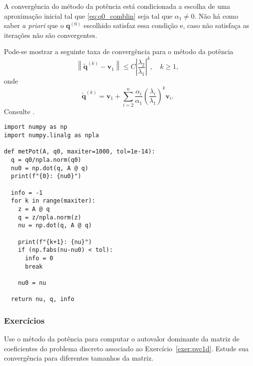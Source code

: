 \begin{observacao}
  A convergência do método da potência está condicionada a escolha de uma aproximação inicial tal que \eqref{eq:q0_comblin} seja tal que $\alpha_1\neq 0$. Não há como saber \textit{a priori} que o $\pmb{q}^{(0)}$ escolhido satisfaz essa condição e, caso não satisfaça as iterações não são convergentes.
\end{observacao}

\begin{obs}
  Pode-se mostrar a seguinte taxa de convergência para o método da potência
  \begin{equation}
    \left\|\tilde{\pmb{q}}^{(k)}-\pmb{v}_1\right\| \leq C\left|\frac{\lambda_2}{\lambda_1}\right|^k,\quad k\geq 1,
  \end{equation}
  onde
  \begin{equation}
    \tilde{\pmb{q}}^{(k)} = \pmb{v}_1 + \sum_{i=2}^n \frac{\alpha_i}{\alpha_1}\left(\frac{\lambda_i}{\lambda_1}\right)^k\pmb{v}_i.
  \end{equation}
  Consulte \cite[Seção 5.3.]{Quarteroni2007a}.
\end{obs}

% 
\begin{lstlisting}[caption=Algoritmo do Método da Potência, label={lst:algMetPot}]
import numpy as np
import numpy.linalg as npla

def metPot(A, q0, maxiter=1000, tol=1e-14):
  q = q0/npla.norm(q0)
  nu0 = np.dot(q, A @ q)
  print(f"{0}: {nu0}")

  info = -1
  for k in range(maxiter):
    z = A @ q
    q = z/npla.norm(z)
    nu = np.dot(q, A @ q)

    print(f"{k+1}: {nu}")
    if (np.fabs(nu-nu0) < tol):
      info = 0
      break

    nu0 = nu

  return nu, q, info  
\end{lstlisting}

\subsubsection{Exercícios}

\begin{exer}
  Use o método da potência para computar o autovalor dominante da matriz de coeficientes do problema discreto associado ao Exercício~\ref{exer:pvc1d}. Estude sua convergência para diferentes tamanhos da matriz.
\end{exer}

